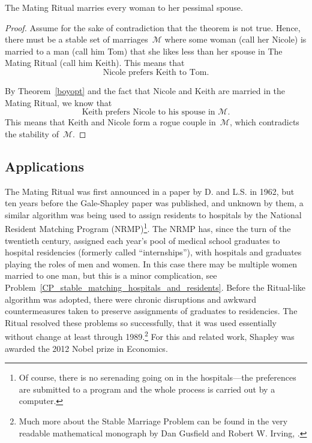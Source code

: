 \begin{theorem}\label{girlpess}
The Mating Ritual marries every woman to her pessimal spouse.
\end{theorem}

\begin{proof}
Assume for the sake of contradiction that the theorem is not true.
Hence, there must be a stable set of marriages~$\mathcal{M}$ where some
woman (call her Nicole) is married to a man (call him Tom) that she
likes less than her spouse in The Mating Ritual (call him Keith).
This means that
\begin{equation}
\text{Nicole prefers Keith to Tom.} \tag{+}
\end{equation}

By Theorem~\ref{boyopt} and the fact that Nicole and Keith are married
in the Mating Ritual, we know that 
\begin{equation}\tag{++}
\text{Keith prefers Nicole to his spouse in~$\mathcal{M}$.}
\end{equation}
This means that Keith and Nicole form a rogue couple in~$\mathcal{M}$,
which contradicts the stability of~$\mathcal{M}$.
\end{proof}

\subsection{Applications}

The Mating Ritual was first announced in a paper by D.  and
L.S.  in 1962, but ten years before the Gale-Shapley
paper was published, and unknown by them, a similar algorithm was
being used to assign residents to hospitals by the National Resident
Matching Program (NRMP)\footnote{Of course, there is no serenading
  going on in the hospitals---the preferences are submitted to a
  program and the whole process is carried out by a computer.}.  The
NRMP has, since the turn of the twentieth century, assigned each
year's pool of medical school graduates to hospital residencies
(formerly called ``internships''), with hospitals and graduates
playing the roles of men and women.  In this case there may be
multiple women married to one man, but this is a minor complication,
see Problem~\ref{CP_stable_matching_hospitals_and_residents}.  Before
the Ritual-like algorithm was adopted, there were chronic disruptions
and awkward countermeasures taken to preserve assignments of graduates
to residencies.  The Ritual resolved these problems so successfully,
that it was used essentially without change at least through
1989.\footnote{Much more about the Stable Marriage Problem can be
  found in the very readable mathematical monograph by Dan Gusfield
  and Robert W. Irving,
  \href{http://mitpress.mit.edu/catalog/item/default.asp?ttype=2&tid=7676}
       {\cite{Gusfield1989}}.}  For this and related work, Shapley was
awarded the 2012 Nobel prize in Economics.

